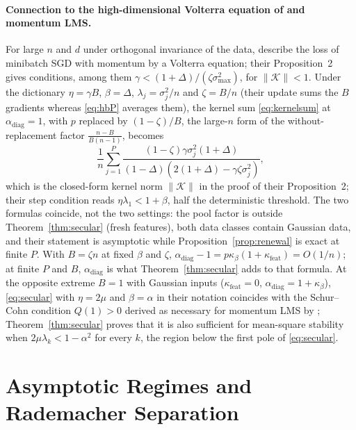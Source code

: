 \documentclass[11pt]{article}
\theoremstyle{remark}
\begin{document}
\paragraph{Connection to the high-dimensional Volterra equation of \citet{lee2022minibatch} and momentum LMS.}
For large $n$ and $d$ under orthogonal invariance of the data, \citet{lee2022minibatch} describe the loss of minibatch SGD with momentum by a Volterra equation; their Proposition~2 gives conditions, among them $\gamma<(1+\Delta)/(\zeta\sigma_{\max}^2)$, for $\|\mathcal K\|<1$. Under the dictionary $\eta = \gamma B$, $\beta = \Delta$, $\lambda_j = \sigma_j^2/n$ and $\zeta=B/n$ (their update sums the $B$ gradients whereas \eqref{eq:hbP} averages them), the kernel sum \eqref{eq:kernelsum} at $\alpha_{\mathrm{diag}} = 1$, with $p$ replaced by $(1-\zeta)/B$, the large-$n$ form of the without-replacement factor $\frac{n-B}{B(n-1)}$, becomes
\[
\frac{1}{n}\sum_{j=1}^P \frac{(1-\zeta)\gamma\sigma_j^2(1+\Delta)}{(1-\Delta)(2(1+\Delta) - \gamma\zeta\sigma_j^2)},
\]
which is the closed-form kernel norm $\|\mathcal K\|$ in the proof of their Proposition~2; their step condition reads $\eta\lambda_1<1+\beta$, half the deterministic threshold. The two formulas coincide, not the two settings: the pool factor is outside Theorem~\ref{thm:secular} (fresh features), both data classes contain Gaussian data, and their statement is asymptotic while Proposition~\ref{prop:renewal} is exact at finite $P$. With $B=\zeta n$ at fixed $\beta$ and $\zeta$, $\alpha_{\mathrm{diag}} - 1 = p\kappa_\beta(1+\kappa_{\mathrm{feat}}) = O(1/n)$; at finite $P$ and $B$, $\alpha_{\mathrm{diag}}$ is what Theorem~\ref{thm:secular} adds to that formula. At the opposite extreme $B = 1$ with Gaussian inputs ($\kappa_{\mathrm{feat}} = 0$, $\alpha_{\mathrm{diag}} = 1+\kappa_\beta$), \eqref{eq:secular} with $\eta=2\mu$ and $\beta=\alpha$ in their notation coincides with the Schur--Cohn condition $Q(1) > 0$ derived as necessary for momentum LMS by \citet[eqs.~(31)--(33)]{roy1990momentum}; Theorem~\ref{thm:secular} proves that it is also sufficient for mean-square stability when $2\mu\lambda_k<1-\alpha^2$ for every $k$, the region below the first pole of \eqref{eq:secular}.

\section{Asymptotic Regimes and Rademacher Separation}\label{sec:numerics}
\end{document}
